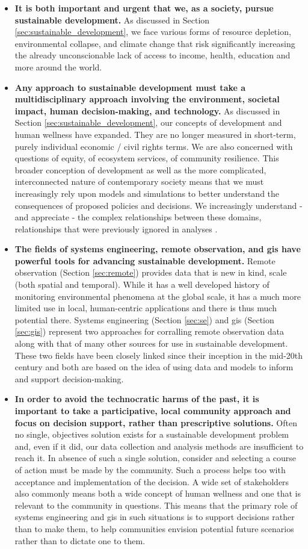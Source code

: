 \begin{itemize}[itemsep=0pt,parsep=0pt]
	\item{\textbf{It is both important and urgent that we, as a society, pursue sustainable development.} As discussed in Section \ref{sec:sustainable_development}, we face various forms of resource depletion, environmental collapse, and climate change that risk significantly increasing the already unconscionable lack of access to income, health, education and more around the world.}
	\item{\textbf{Any approach to sustainable development must take a multidisciplinary approach involving the environment, societal impact, human decision-making, and technology.} As discussed in Section \ref{sec:sustainable_development}, our concepts of development and human wellness have expanded. They are no longer measured in short-term, purely individual economic / civil rights terms. We are also concerned with questions of equity, of ecosystem services, of community resilience. This broader conception of development as well as the more complicated, interconnected nature of contemporary society means that we must increasingly rely upon models and simulations to better understand the consequences of proposed policies and decisions. We increasingly understand - and appreciate - the complex relationships between these domains, relationships that were previously ignored in analyses \cite{gaheganMultivariateGeovisualization2007}. }
	\item{\textbf{The fields of systems engineering, remote observation, and \ac{gis}  have powerful tools for advancing sustainable development.}  Remote observation (Section \ref{sec:remote}) provides data that is new in kind, scale (both spatial and temporal). While it has a well developed history of monitoring environmental phenomena at the global scale, it has a much more limited use in local, human-centric applications and there is thus much potential there. Systems engineering (Section \ref{sec:se}) and \ac{gis} (Section \ref{sec:gis}) represent two approaches for corralling remote observation data along with that of many other sources for use in sustainable development. These two fields have been closely linked since their inception in the mid-20th century and both are based on the idea of using data and models to inform and support decision-making. }
	\item{\textbf{In order to avoid the technocratic harms of the past, it is important to take a participative, local community approach and focus on decision support, rather than prescriptive solutions.} Often no single, objectives solution exists for a sustainable development problem and, even if it did, our data collection and analysis methods are insufficient to reach it. In absence of such a single solution, consider and selecting a course of action must be made by the community. Such a process helps too with acceptance and implementation of the decision. A wide set of stakeholders also commonly means both a wide concept of human wellness and one that is relevant to the community in questions. This means that the primary role of systems engineering and \ac{gis} in such situations is to support decisions rather than to make them, to help communities envision potential future scenarios rather than to dictate one to them.}

\end{itemize}
